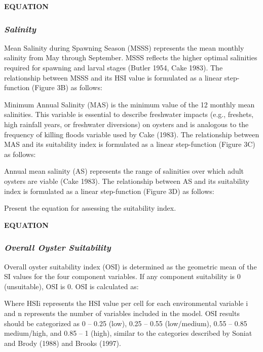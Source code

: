 \documentclass[
]{book}
\begin{document}
\textbf{EQUATION}

\hypertarget{salinity-1}{%
\subsubsection{\texorpdfstring{\emph{Salinity}}{Salinity}}\label{salinity-1}}

Mean Salinity during Spawning Season (MSSS) represents the mean monthly salinity from May through September. MSSS reflects the higher optimal salinities required for spawning and larval stages (Butler 1954, Cake 1983). The relationship between MSSS and its HSI value is formulated as a linear step-function (Figure 3B) as follows:

Minimum Annual Salinity (MAS) is the minimum value of the 12 monthly mean salinities. This variable is essential to describe freshwater impacts (e.g., freshets, high rainfall years, or freshwater diversions) on oysters and is analogous to the frequency of killing floods variable used by Cake (1983). The relationship between MAS and its suitability index is formulated as a linear step-function (Figure 3C) as follows:

Annual mean salinity (AS) represents the range of salinities over which adult oysters are viable (Cake 1983). The relationship between AS and its suitability index is formulated as a linear step-function (Figure 3D) as follows:

Present the equation for assessing the suitability index.

\textbf{EQUATION}

\hypertarget{overall-oyster-suitability}{%
\subsubsection{\texorpdfstring{\emph{Overall Oyster Suitability}}{Overall Oyster Suitability}}\label{overall-oyster-suitability}}

Overall oyster suitability index (OSI) is determined as the geometric mean of the SI values for the four component variables. If any component suitability is 0 (unsuitable), OSI is 0. OSI is calculated as:

Where HSIi represents the HSI value per cell for each environmental variable i and n represents the number of variables included in the model. OSI results should be categorized as 0 -- 0.25 (low), 0.25 -- 0.55 (low/medium), 0.55 -- 0.85 medium/high, and 0.85 -- 1 (high), similar to the categories described by Soniat and Brody (1988) and Brooks (1997).
\end{document}
